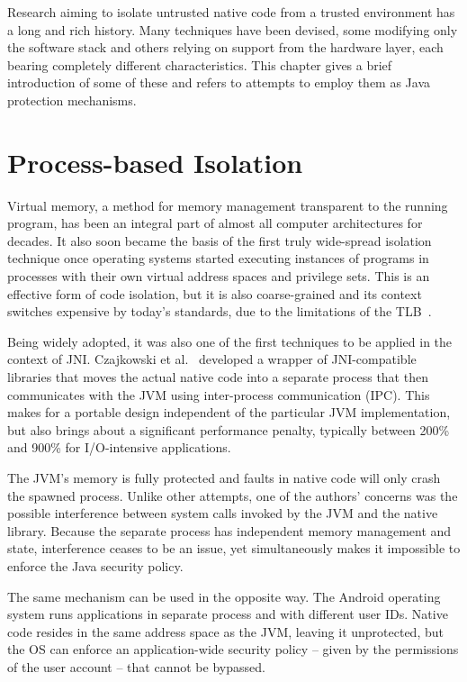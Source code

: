 \documentclass[a4paper,12pt,twoside,openright]{report}
\begin{document}
Research aiming to isolate untrusted native code from a trusted environment has a long and rich history. Many techniques have been devised, some modifying only the software stack and others relying on support from the hardware layer, each bearing completely different characteristics. This chapter gives a brief introduction of some of these and refers to attempts to employ them as Java protection mechanisms.

\section{Process-based Isolation}

Virtual memory, a method for memory management transparent to the running program, has been an integral part of almost all computer architectures for decades. It also soon became the basis of the first truly wide-spread isolation technique once operating systems started executing instances of programs in processes with their own virtual address spaces and privilege sets. This is an effective form of code isolation, but it is also coarse-grained and its context switches expensive by today's standards, due to the limitations of the TLB~\cite{basu2012reducing}. 

Being widely adopted, it was also one of the first techniques to be applied in the context of JNI. Czajkowski et al.~\cite{989483} developed a wrapper of JNI-compatible libraries that moves the actual native code into a separate process that then communicates with the JVM using inter-process communication (IPC). This makes for a portable design independent of the particular JVM implementation, but also brings about a significant performance penalty, typically between 200\% and 900\% for I/O-intensive applications.

The JVM's memory is fully protected and faults in native code will only crash the spawned process. Unlike other attempts, one of the authors' concerns was the possible interference between system calls invoked by the JVM and the native library. Because the separate process has independent memory management and state, interference ceases to be an issue, yet simultaneously makes it impossible to enforce the Java security policy.

The same mechanism can be used in the opposite way. The Android operating system runs applications in separate process and with different user IDs. Native code resides in the same address space as the JVM, leaving it unprotected, but the OS can enforce an application-wide security policy -- given by the permissions of the user account -- that cannot be bypassed.
\end{document}
